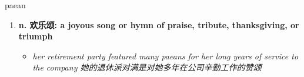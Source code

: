 
\begin{frame}
{\huge paean}
\begin{center}
\begin{enumerate}\Large
  \item \textbf{n. 欢乐颂: a joyous song or hymn of praise, tribute, thanksgiving, or triumph}
  \begin{itemize}
    \item \em{\Large{her retirement party featured many paeans for her long years of service to the company 她的退休派对满是对她多年在公司辛勤工作的赞颂}}
  \end{itemize}
\end{enumerate}
\end{center}
\end{frame}
